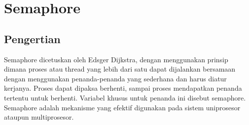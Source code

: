 
\section{Semaphore}

	\subsection{Pengertian}
	Semaphore dicetuskan oleh Edsger Dijkstra, dengan menggunakan prinsip  dimana proses atau thread yang lebih dari satu dapat dijalankan bersamaan dengan menggunakan penanda-penanda yang sederhana dan harus diatur kerjanya. Proses dapat dipaksa berhenti, sampai proses mendapatkan penanda tertentu untuk berhenti. Variabel khusus untuk penanda ini disebut semaphore. Semaphore adalah mekanisme yang efektif digunakan pada sistem uniprosesor ataupun multiprosesor.
